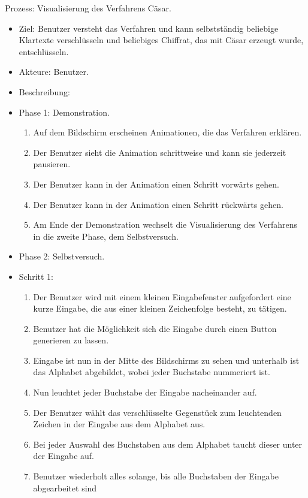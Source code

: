 \documentclass{article}
\begin{document}
\begin{FA}[start=110]
 \item Prozess: Visualisierung des Verfahrens Cäsar.
\end{FA}
\begin{itemize}[label={}]
 \item Ziel: Benutzer versteht das Verfahren und kann selbstständig 
 beliebige Klartexte verschlüsseln und beliebiges Chiffrat, das mit Cäsar erzeugt wurde, entschlüsseln.
 \item Akteure: Benutzer.
 \item Beschreibung:
 \item Phase 1: Demonstration.
\begin{enumerate}[]
 \item Auf dem Bildschirm erscheinen Animationen, die das Verfahren erklären.
 \item Der Benutzer sieht die Animation schrittweise und kann sie jederzeit pausieren.
 \item Der Benutzer kann in der Animation einen Schritt vorwärts gehen.
 \item Der Benutzer kann in der Animation einen Schritt rückwärts gehen. 
 \item Am Ende der Demonstration wechselt die Visualisierung des Verfahrens in die zweite Phase, dem Selbstversuch.
\end{enumerate}
 \item Phase 2: Selbstversuch.
 \item Schritt 1:
 \begin{enumerate}
  \item Der Benutzer wird mit einem kleinen Eingabefenster aufgefordert eine kurze Eingabe, 
        die aus einer kleinen Zeichenfolge besteht, zu tätigen.
  \item Benutzer hat die Möglichkeit sich die Eingabe durch einen Button generieren zu lassen.
  \item Eingabe ist nun in der Mitte des Bildschirms zu sehen und unterhalb ist das Alphabet 
        abgebildet, wobei jeder Buchstabe nummeriert ist.     
  \item Nun leuchtet jeder Buchstabe der Eingabe nacheinander auf.
  \item Der Benutzer wählt das verschlüsselte Gegenstück zum leuchtenden Zeichen in der Eingabe aus dem Alphabet aus. 
  \item Bei jeder Auswahl des Buchstaben aus dem Alphabet taucht dieser unter der Eingabe auf.
  \item[] Benutzer wiederholt alles solange, bis alle Buchstaben der Eingabe abgearbeitet sind 

\end{enumerate}
\end{itemize}
\end{document}
